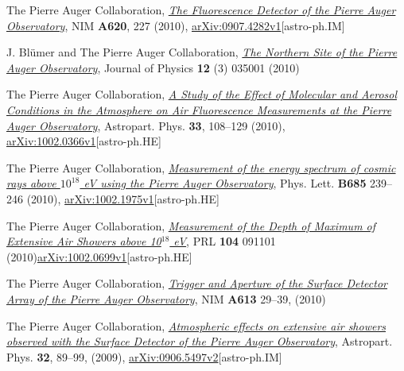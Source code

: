 \documentclass[11pt, a4paper]{article}
\newcommand{\years}[1]{\marginnote{\scriptsize #1}}
\begin{document}
\begin{etaremune}
\item \years{2010}The Pierre Auger Collaboration,
\href{http://dx.doi.org/10.1016/j.nima.2010.04.023}{\emph{The Fluorescence
Detector of the Pierre Auger Observatory}}, NIM {\bf A620}, 227 (2010),
\href{http://arxiv.org/abs/0907.4282}{arXiv:0907.4282v1}[astro-ph.IM]

\item \years{2010}J. Bl\"umer and The Pierre Auger Collaboration,
\href{http://dx.doi.org/10.1088/1367-2630/12/3/035001}{\emph{The Northern Site
of the Pierre Auger Observatory}}, Journal of Physics {\bf 12} (3) 035001
(2010)

\item \years{2010}The Pierre Auger Collaboration,
\href{http://dx.doi.org/10.1016/j.astropartphys.2009.12.005}{\emph{A Study of
the Effect of Molecular and Aerosol Conditions in the Atmosphere on Air
Fluorescence Measurements at the Pierre Auger Observatory}}, Astropart. Phys.
{\bf 33}, 108--129 (2010),
\href{http://arxiv.org/abs/0907.4282}{arXiv:1002.0366v1}[astro-ph.HE]

\item \years{2010}The Pierre Auger Collaboration,
\href{http://dx.doi.org/10.1016/j.physletb.2010.02.013}{\emph{Measurement of
the energy spectrum of cosmic rays above $10^{18}$ eV using the Pierre Auger
Observatory}}, Phys. Lett. {\bf B685} 239--246 (2010),
\href{http://arxiv.org/abs/1002.1975}{arXiv:1002.1975v1}[astro-ph.HE]

\item \years{2010}The Pierre Auger Collaboration,
\href{http://dx.doi.org/10.1103/PhysRevLett.104.091101}{\emph{Measurement of
the Depth of Maximum of Extensive Air Showers above 10$^{18}$ eV}}, PRL {\bf
104} 091101
(2010)\href{http://arxiv.org/abs/1002.0699}{arXiv:1002.0699v1}[astro-ph.HE]

\item \years{2010}The Pierre Auger Collaboration,
\href{http://dx.doi.org/10.1016/j.nima.2009.11.018}{\emph{Trigger and Aperture
of the Surface Detector Array of the Pierre Auger Observatory}}, NIM {\bf A613}
29--39, (2010)

\item \years{2009} The Pierre Auger Collaboration,
\href{http://dx.doi.org/10.1016/j.astropartphys.2009.06.004}{\emph{Atmospheric
effects on extensive air showers observed with the Surface Detector of the
Pierre Auger Observatory}}, Astropart. Phys. {\bf 32}, 89--99, (2009),
\href{http://arxiv.org/abs/0906.5497/}{arXiv:0906.5497v2}[astro-ph.IM]


\end{etaremune}
\end{document}
